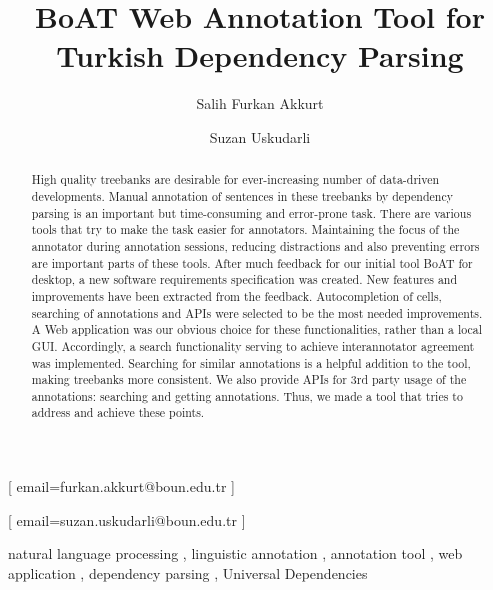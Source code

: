 \documentclass[
]{ceurart}
\begin{document}


\title{BoAT Web Annotation Tool for Turkish Dependency Parsing}

\author[]{Salih Furkan Akkurt}[%
email=furkan.akkurt@boun.edu.tr
]
\author[]{Suzan Uskudarli}[%
email=suzan.uskudarli@boun.edu.tr
]

\address[]{ Department of Computer Engineering, Bogazici University, Bebek, 34342, İstanbul, Turkey }

\begin{abstract}
High quality treebanks are desirable for ever-increasing number of data-driven developments.
Manual annotation of sentences in these treebanks by dependency parsing is an important but time-consuming and error-prone task.
There are various tools that try to make the task easier for annotators.
Maintaining the focus of the annotator during annotation sessions, reducing distractions and also preventing errors are important parts of these tools.
After much feedback for our initial tool BoAT for desktop, a new software requirements specification was created.
New features and improvements have been extracted from the feedback.
Autocompletion of cells, searching of annotations and APIs were selected to be the most needed improvements.
A Web application was our obvious choice for these functionalities, rather than a local GUI.
Accordingly, a search functionality serving to achieve interannotator agreement was implemented.
Searching for similar annotations is a helpful addition to the tool, making treebanks more consistent.
We also provide APIs for 3rd party usage of the annotations: searching and getting annotations.
Thus, we made a tool that tries to address and achieve these points.
\end{abstract}

\begin{keywords}
natural language processing \sep
linguistic annotation \sep
annotation tool \sep
web application \sep
dependency parsing \sep
Universal Dependencies
\end{keywords}
\end{document}
